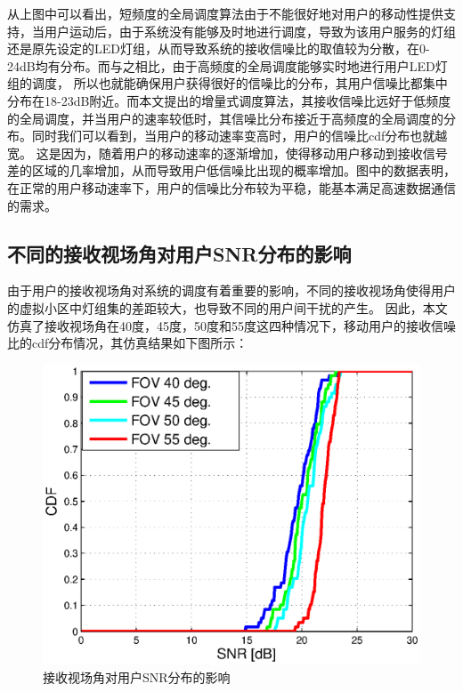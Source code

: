从上图中可以看出，短频度的全局调度算法由于不能很好地对用户的移动性提供支持，当用户运动后，由于系统没有能够及时地进行调度，导致为该用户服务的灯组还是原先设定的LED灯组，从而导致系统的接收信噪比的取值较为分散，在0-24dB均有分布。而与之相比，由于高频度的全局调度能够实时地进行用户LED灯组的调度，
所以也就能确保用户获得很好的信噪比的分布，其用户信噪比都集中分布在18-23dB附近。而本文提出的增量式调度算法，其接收信噪比远好于低频度的全局调度，并当用户的速率较低时，其信噪比分布接近于高频度的全局调度的分布。同时我们可以看到，当用户的移动速率变高时，用户的信噪比cdf分布也就越宽。
这是因为，随着用户的移动速率的逐渐增加，使得移动用户移动到接收信号差的区域的几率增加，从而导致用户低信噪比出现的概率增加。图中的数据表明，在正常的用户移动速率下，用户的信噪比分布较为平稳，能基本满足高速数据通信的需求。

\subsection{不同的接收视场角对用户SNR分布的影响}
由于用户的接收视场角对系统的调度有着重要的影响，不同的接收视场角使得用户的虚拟小区中灯组集的差距较大，也导致不同的用户间干扰的产生。
因此，本文仿真了接收视场角在40度，45度，50度和55度这四种情况下，移动用户的接收信噪比的cdf分布情况，其仿真结果如下图所示：

\begin{figure}[htbp]
    \centering
	\includegraphics[width=\textwidth]{figures/chapter-5/Fov2Snr.eps}
	\caption{接收视场角对用户SNR分布的影响}
	\label{fig:Fov-2-Snr}
\end{figure}

